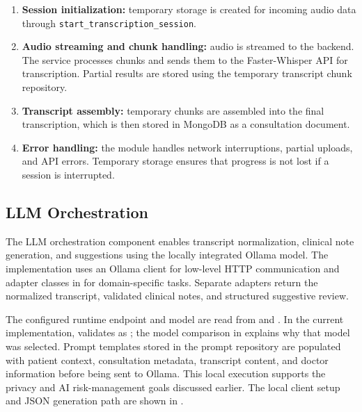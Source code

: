 \begin{enumerate}
  \item \textbf{Session initialization:} temporary storage is created for incoming audio data through \texttt{start\_transcription\_session}.
  \item \textbf{Audio streaming and chunk handling:} audio is streamed to the backend. The service processes chunks and sends them to the Faster-Whisper API for transcription. Partial results are stored using the temporary transcript chunk repository.
  \item \textbf{Transcript assembly:} temporary chunks are assembled into the final transcription, which is then stored in MongoDB as a consultation document.
  \item \textbf{Error handling:} the module handles network interruptions, partial uploads, and API errors. Temporary storage ensures that progress is not lost if a session is interrupted.
\end{enumerate}

\subsection{LLM Orchestration}
\label{subsec:llm-orchestration}

The LLM orchestration component enables transcript normalization, clinical note generation, and suggestions using the locally integrated Ollama model. The implementation uses an Ollama client for low-level HTTP communication and adapter classes in  for domain-specific tasks. Separate adapters return the normalized transcript, validated clinical notes, and structured suggestive review.

The configured runtime endpoint and model are read from  and . In the current implementation,  validates  as ; the model comparison in  explains why that model was selected. Prompt templates stored in the prompt repository are populated with patient context, consultation metadata, transcript content, and doctor information before being sent to Ollama. This local execution supports the privacy and AI risk-management goals discussed earlier. The local client setup and JSON generation path are shown in .


